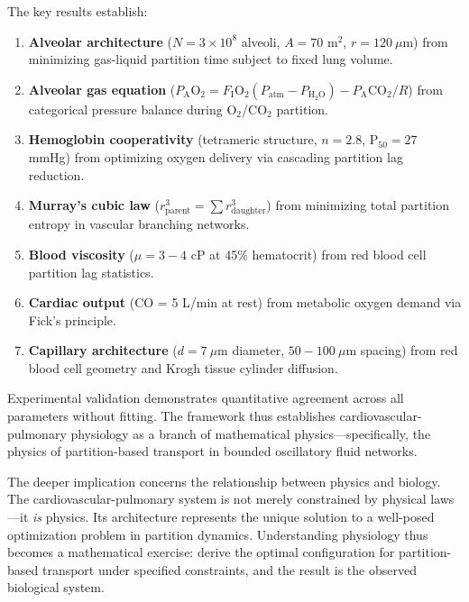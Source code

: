 \documentclass[10pt,twocolumn,a4paper]{article}
\theoremstyle{remark}
\begin{document}
The key results establish:

\begin{enumerate}
\item \textbf{Alveolar architecture} ($N = 3 \times 10^{8}$ alveoli, $A = 70$ m$^{2}$, $r = 120~\mu$m) from minimizing gas-liquid partition time subject to fixed lung volume.

\item \textbf{Alveolar gas equation} ($P_{\mathrm{A}}\mathrm{O}_{2} = F_{\mathrm{I}}\mathrm{O}_{2}(P_{\mathrm{atm}} - P_{\mathrm{H}_{2}\mathrm{O}}) - P_{\mathrm{A}}\mathrm{CO}_{2}/R$) from categorical pressure balance during O$_{2}$/CO$_{2}$ partition.

\item \textbf{Hemoglobin cooperativity} (tetrameric structure, $n = 2.8$, P$_{50} = 27$ mmHg) from optimizing oxygen delivery via cascading partition lag reduction.

\item \textbf{Murray's cubic law} ($r_{\mathrm{parent}}^{3} = \sum r_{\mathrm{daughter}}^{3}$) from minimizing total partition entropy in vascular branching networks.

\item \textbf{Blood viscosity} ($\mu = 3-4$ cP at 45\% hematocrit) from red blood cell partition lag statistics.

\item \textbf{Cardiac output} (CO = 5 L/min at rest) from metabolic oxygen demand via Fick's principle.

\item \textbf{Capillary architecture} ($d = 7~\mu$m diameter, $50-100~\mu$m spacing) from red blood cell geometry and Krogh tissue cylinder diffusion.
\end{enumerate}

Experimental validation demonstrates quantitative agreement across all parameters without fitting. The framework thus establishes cardiovascular-pulmonary physiology as a branch of mathematical physics—specifically, the physics of partition-based transport in bounded oscillatory fluid networks.

The deeper implication concerns the relationship between physics and biology. The cardiovascular-pulmonary system is not merely constrained by physical laws—it \textit{is} physics. Its architecture represents the unique solution to a well-posed optimization problem in partition dynamics. Understanding physiology thus becomes a mathematical exercise: derive the optimal configuration for partition-based transport under specified constraints, and the result is the observed biological system.
\end{document}
